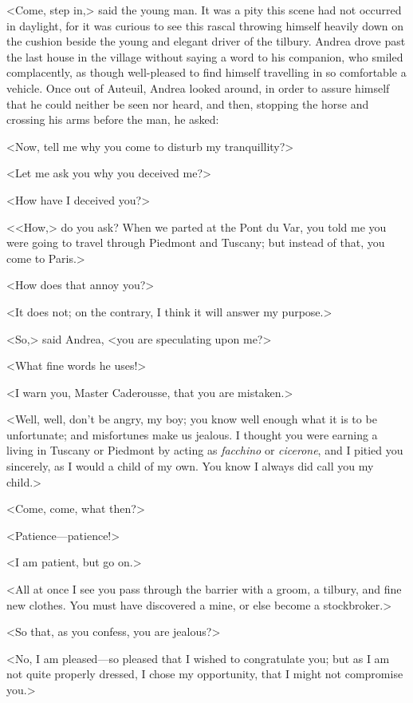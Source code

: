  <Come, step in,> said the young man. It was a pity this scene had not occurred in daylight, for it was curious to see this rascal throwing himself heavily down on the cushion beside the young and elegant driver of the tilbury. Andrea drove past the last house in the village without saying a word to his companion, who smiled complacently, as though well-pleased to find himself travelling in so comfortable a vehicle. Once out of Auteuil, Andrea looked around, in order to assure himself that he could neither be seen nor heard, and then, stopping the horse and crossing his arms before the man, he asked: 

 <Now, tell me why you come to disturb my tranquillity?> 

 <Let me ask you why you deceived me?> 

 <How have I deceived you?> 

 <<How,> do you ask? When we parted at the Pont du Var, you told me you were going to travel through Piedmont and Tuscany; but instead of that, you come to Paris.> 

 <How does that annoy you?> 

 <It does not; on the contrary, I think it will answer my purpose.> 

 <So,> said Andrea, <you are speculating upon me?> 

 <What fine words he uses!> 

 <I warn you, Master Caderousse, that you are mistaken.> 

 <Well, well, don't be angry, my boy; you know well enough what it is to be unfortunate; and misfortunes make us jealous. I thought you were earning a living in Tuscany or Piedmont by acting as \textit{facchino} or \textit{cicerone}, and I pitied you sincerely, as I would a child of my own. You know I always did call you my child.> 

 <Come, come, what then?> 

 <Patience—patience!> 

 <I am patient, but go on.> 

 <All at once I see you pass through the barrier with a groom, a tilbury, and fine new clothes. You must have discovered a mine, or else become a stockbroker.> 

 <So that, as you confess, you are jealous?> 

 <No, I am pleased—so pleased that I wished to congratulate you; but as I am not quite properly dressed, I chose my opportunity, that I might not compromise you.> 

